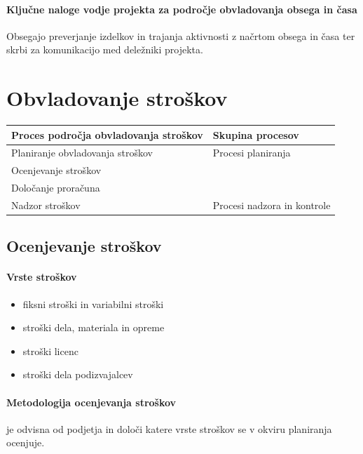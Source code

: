 \documentclass[a4paper,12pt]{report}
\begin{document}
         \paragraph{Ključne naloge vodje projekta za področje obvladovanja obsega in časa} Obsegajo preverjanje izdelkov in trajanja aktivnosti z načrtom obsega in časa ter skrbi za komunikacijo med deležniki projekta.
   
   \section{Obvladovanje stroškov}
      \begin{center}
         \begin{tabular}{|l|l|}
            \hline
            \textbf{Proces področja obvladovanja stroškov} & \textbf{Skupina procesov} \\
            \hline
            \hline
            Planiranje obvladovanja stroškov & Procesi planiranja \\
            Ocenjevanje stroškov & \\
            Določanje proračuna & \\
            \hline
            Nadzor stroškov & Procesi nadzora in kontrole \\
            \hline
         \end{tabular}
      \end{center}

      \subsection{Ocenjevanje stroškov}
         \paragraph{Vrste stroškov}
            \begin{itemize}
               \item fiksni stroški in variabilni stroški
               \item stroški dela, materiala in opreme
               \item stroški licenc
               \item stroški dela podizvajalcev
            \end{itemize}
         \paragraph{Metodologija ocenjevanja stroškov} je odvisna od podjetja in določi katere vrste stroškov se v okviru planiranja ocenjuje.
      
\end{document}
